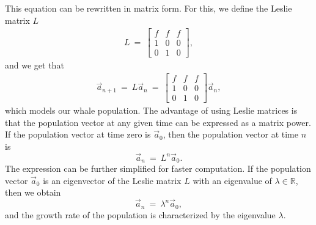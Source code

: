 \documentclass[11pt,reqno]{amsart}
\numberwithin{equation}{section}
\theoremstyle{plain}
\begin{document}
This equation can be rewritten in matrix form. For this, we define the Leslie matrix $L$
\begin{eqnarray}
   L \ = \ 
    \begin{bmatrix}
        f & f & f \\ 
        1 & 0 & 0 \\
        0 & 1 & 0
    \end{bmatrix}, \nonumber
\end{eqnarray}
and we get that
\begin{eqnarray}
    \vec a_{n + 1} \ =\ L\vec a_n \ = \ 
    \begin{bmatrix}
        f & f & f \\ 
        1 & 0 & 0 \\
        0 & 1 & 0
    \end{bmatrix}\vec a_n,
\end{eqnarray}
which models our whale population. The advantage of using Leslie matrices is that the population vector at any given time can be expressed as a matrix power. If the population vector at time zero is $\vec a_0$, then the population vector at 
time $n$ is 
\begin{equation}
    \vec a_n  \ = \ L^n \vec a_0.
\end{equation}
The expression can be further simplified for faster computation. If the population vector $\vec a_0$ is an eigenvector of the Leslie matrix $L$ with an eigenvalue of $\lambda \in \mathbb R$, then we obtain 
\begin{equation}
    \vec a_n  \ = \ \lambda^n \vec a_0,
\end{equation}
and the growth rate of the population is characterized by the eigenvalue $\lambda$. 
\end{document}
